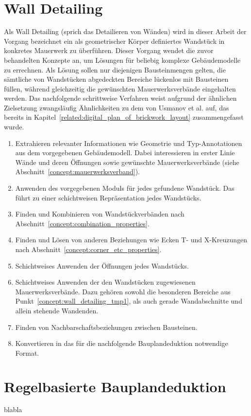 \section{Wall Detailing}
\label{concept:wall_detailing}
Als \glqq{}Wall Detailing\grqq{} (sprich das \glqq{}Detailieren von Wänden\grqq{}) wird in dieser Arbeit der Vorgang bezeichnet ein als geometrischer Körper definiertes Wandstück in konkretes Mauerwerk zu überführen.
Dieser Vorgang wendet die zuvor behandelten Konzepte an, um Lösungen für beliebig komplexe Gebäudemodelle zu errechnen.
Als Lösung sollen nur diejenigen Bausteinmengen gelten, die sämtliche von Wandstücken abgedeckten Bereiche lückenlos mit Bausteinen füllen, während gleichzeitig die gewünschten Mauerwerksverbände eingehalten werden.
Das nachfolgende schrittweise Verfahren weist aufgrund der ähnlichen Zielsetzung zwangsläufig Ähnlichkeiten zu dem von Usmanov et al. auf, das bereits in Kapitel~\ref{related:digital_plan_of_brickwork_layout} zusammengefasst wurde.

\begin{enumerate}
    \item Extrahieren relevanter Informationen wie Geometrie und Typ-Annotationen aus dem vorgegebenen Gebäudemodell. Dabei interessieren in erster Linie Wände und deren Öffnungen sowie gewünschte Mauerwerksverbände (siehe Abschnitt~\ref{concept:mauerwerksverband}).
    \item Anwenden des vorgegebenen Moduls für jedes gefundene Wandstück. Das führt zu einer schichtweisen Repräsentation jedes Wandstücks.
    \item Finden und Kombinieren von Wandstückverbänden nach Abschnitt~\ref{concept:combination_properties}.
    \item\label{concept:wall_detailing_tmp1} Finden und Lösen von anderen Beziehungen wie Ecken T- und X-Kreuzungen nach Abschnitt~\ref{concept:corner_etc_properties}.
    \item Schichtweises Anwenden der Öffnungen jedes Wandstücks.
    \item Schichtweises Anwenden der den Wandstücken zugewiesenen Mauerwerksverbände. Dazu gehören sowohl die besonderen Bereiche aus Punkt~\ref{concept:wall_detailing_tmp1}, als auch gerade Wandabschnitte und allein stehende Wandenden.
    \item Finden von Nachbarschaftsbeziehungen zwischen Bausteinen.
    \item Konvertieren in das für die nachfolgende Bauplandeduktion notwendige Format.
\end{enumerate}

\section{Regelbasierte Bauplandeduktion}
blabla
